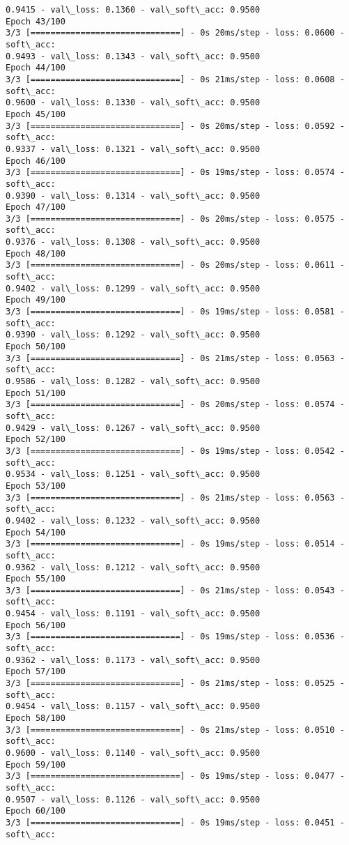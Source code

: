 \documentclass[11pt]{article}
\begin{document}
\begin{Verbatim}[commandchars=\\\{\}]
0.9415 - val\_loss: 0.1360 - val\_soft\_acc: 0.9500
Epoch 43/100
3/3 [==============================] - 0s 20ms/step - loss: 0.0600 - soft\_acc:
0.9493 - val\_loss: 0.1343 - val\_soft\_acc: 0.9500
Epoch 44/100
3/3 [==============================] - 0s 21ms/step - loss: 0.0608 - soft\_acc:
0.9600 - val\_loss: 0.1330 - val\_soft\_acc: 0.9500
Epoch 45/100
3/3 [==============================] - 0s 20ms/step - loss: 0.0592 - soft\_acc:
0.9337 - val\_loss: 0.1321 - val\_soft\_acc: 0.9500
Epoch 46/100
3/3 [==============================] - 0s 19ms/step - loss: 0.0574 - soft\_acc:
0.9390 - val\_loss: 0.1314 - val\_soft\_acc: 0.9500
Epoch 47/100
3/3 [==============================] - 0s 20ms/step - loss: 0.0575 - soft\_acc:
0.9376 - val\_loss: 0.1308 - val\_soft\_acc: 0.9500
Epoch 48/100
3/3 [==============================] - 0s 20ms/step - loss: 0.0611 - soft\_acc:
0.9402 - val\_loss: 0.1299 - val\_soft\_acc: 0.9500
Epoch 49/100
3/3 [==============================] - 0s 19ms/step - loss: 0.0581 - soft\_acc:
0.9390 - val\_loss: 0.1292 - val\_soft\_acc: 0.9500
Epoch 50/100
3/3 [==============================] - 0s 21ms/step - loss: 0.0563 - soft\_acc:
0.9586 - val\_loss: 0.1282 - val\_soft\_acc: 0.9500
Epoch 51/100
3/3 [==============================] - 0s 20ms/step - loss: 0.0574 - soft\_acc:
0.9429 - val\_loss: 0.1267 - val\_soft\_acc: 0.9500
Epoch 52/100
3/3 [==============================] - 0s 19ms/step - loss: 0.0542 - soft\_acc:
0.9534 - val\_loss: 0.1251 - val\_soft\_acc: 0.9500
Epoch 53/100
3/3 [==============================] - 0s 21ms/step - loss: 0.0563 - soft\_acc:
0.9402 - val\_loss: 0.1232 - val\_soft\_acc: 0.9500
Epoch 54/100
3/3 [==============================] - 0s 19ms/step - loss: 0.0514 - soft\_acc:
0.9362 - val\_loss: 0.1212 - val\_soft\_acc: 0.9500
Epoch 55/100
3/3 [==============================] - 0s 21ms/step - loss: 0.0543 - soft\_acc:
0.9454 - val\_loss: 0.1191 - val\_soft\_acc: 0.9500
Epoch 56/100
3/3 [==============================] - 0s 19ms/step - loss: 0.0536 - soft\_acc:
0.9362 - val\_loss: 0.1173 - val\_soft\_acc: 0.9500
Epoch 57/100
3/3 [==============================] - 0s 21ms/step - loss: 0.0525 - soft\_acc:
0.9454 - val\_loss: 0.1157 - val\_soft\_acc: 0.9500
Epoch 58/100
3/3 [==============================] - 0s 21ms/step - loss: 0.0510 - soft\_acc:
0.9600 - val\_loss: 0.1140 - val\_soft\_acc: 0.9500
Epoch 59/100
3/3 [==============================] - 0s 19ms/step - loss: 0.0477 - soft\_acc:
0.9507 - val\_loss: 0.1126 - val\_soft\_acc: 0.9500
Epoch 60/100
3/3 [==============================] - 0s 19ms/step - loss: 0.0451 - soft\_acc:

\end{Verbatim}
\end{document}
